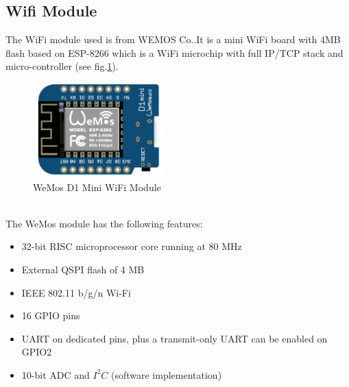 \subsection{Wifi Module}
The WiFi module used is from WEMOS Co.\cite{wemosd1mini}.It is a mini WiFi board with 4MB flash based on ESP-8266 which is a WiFi microchip with full IP/TCP stack and micro-controller (see fig.\ref{wemos}).
\begin{figure}[!htbp]
	\centering
	\includegraphics[width = 5cm]{Pictures/wemos}
	\caption{WeMos D1 Mini WiFi Module}
	\label{wemos}
\end{figure}
\\
The WeMos module has the following features:
\begin{itemize}
	\item 32-bit RISC microprocessor core running at 80 MHz
	\item External QSPI flash of 4 MB
	\item IEEE 802.11 b/g/n Wi-Fi
	\item 16 GPIO pins
	\item UART on dedicated pins, plus a transmit-only UART can be enabled on GPIO2
	\item 10-bit ADC and \(I^2C\) (software implementation)
\end{itemize}
